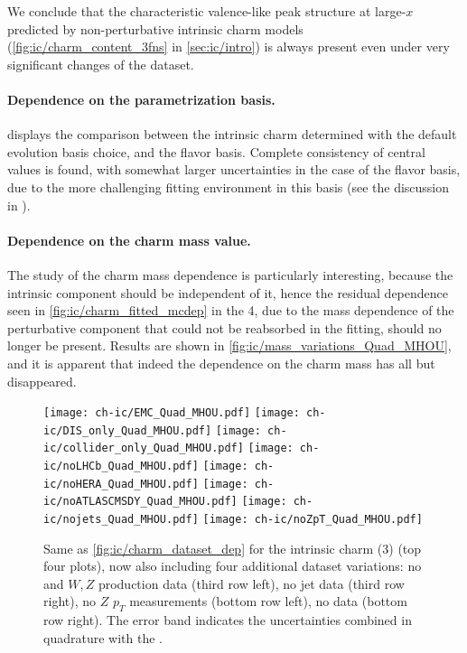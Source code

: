 We conclude that the characteristic valence-like peak structure at large-$x$
predicted by non-perturbative intrinsic charm models
(\cref{fig:ic/charm_content_3fns} in \cref{sec:ic/intro}) is always present
even under very significant changes of the dataset.

\paragraph{Dependence on the parametrization basis.}
%
 displays the comparison between the intrinsic
charm \pdf determined with the default evolution basis choice, and the flavor
basis. Complete consistency of central values is found, with somewhat larger
uncertainties in the case of the flavor basis, due to the more  challenging
fitting environment in this basis (see the discussion in \cite{Ball:2021leu}).

\paragraph{Dependence on the charm mass value.}
%
The study of the charm mass dependence is particularly interesting, because the
intrinsic component should be independent of it, hence the residual dependence
seen in \cref{fig:ic/charm_fitted_mcdep} in the 4\fns, due to the mass
dependence of the perturbative component that could not be reabsorbed in the
fitting, should no longer be present. 
Results are shown in \cref{fig:ic/mass_variations_Quad_MHOU}, and it is
apparent that indeed the dependence on the charm mass has all but disappeared.

\begin{figure}[H]
  \centering
  \texttt{[image: ch-ic/EMC\_Quad\_MHOU.pdf]}
  \texttt{[image: ch-ic/DIS\_only\_Quad\_MHOU.pdf]}
  \texttt{[image: ch-ic/collider\_only\_Quad\_MHOU.pdf]}
  \texttt{[image: ch-ic/noLHCb\_Quad\_MHOU.pdf]}
  \texttt{[image: ch-ic/noHERA\_Quad\_MHOU.pdf]}
  \texttt{[image: ch-ic/noATLASCMSDY\_Quad\_MHOU.pdf]}
  \texttt{[image: ch-ic/nojets\_Quad\_MHOU.pdf]}
  \texttt{[image: ch-ic/noZpT\_Quad\_MHOU.pdf]}
  \caption{\small
    Same as \cref{fig:ic/charm_dataset_dep} for the intrinsic charm (3\fns)
    \pdf (top four plots), now also including four additional dataset
    variations:  no \atlas and \cms $W, Z$ production data   (third row left),
    no jet data (third row right), no $Z$ $p_T$ measurements (bottom row left),
    no \hera \dis data (bottom row right). 
    The error band indicates the \pdf uncertainties combined in quadrature with
    the .
  }
  \label{fig:ic/charm_dataset_dep_nf3}
\end{figure}


